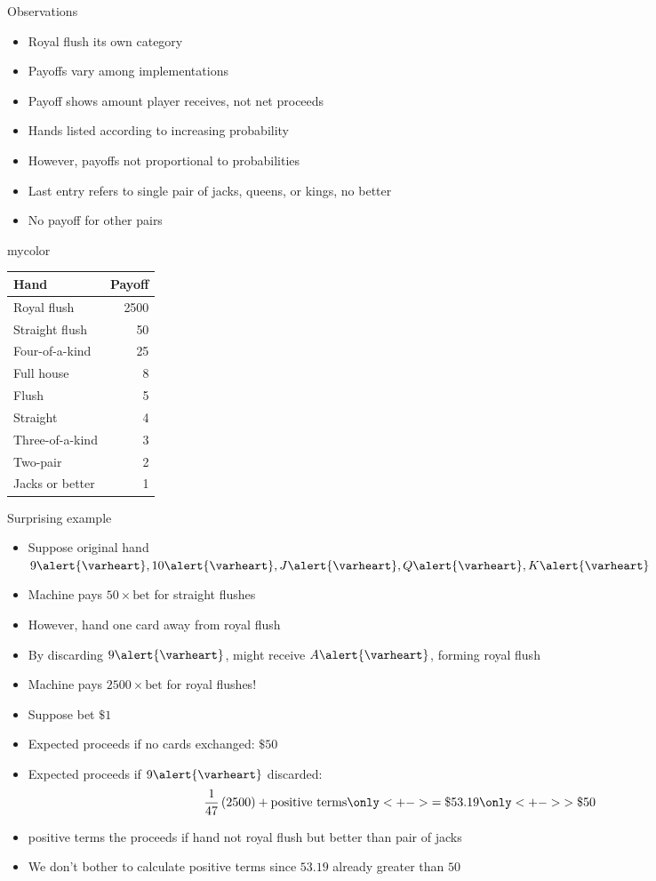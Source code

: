 \documentclass[handout,xcolor=dvipsnames]{beamer}
\theoremstyle{definition}
\newcommand{\hs}{\alert{\varheart}}
\begin{document}
\begin{frame}{Observations}
\begin{multicols}{2}
\begin{itemize}
\item Royal flush its own category
\item Payoffs vary among implementations
\item Payoff shows amount player receives, not net proceeds
\item Hands listed according to increasing probability
\item However, payoffs not proportional to probabilities
\item Last entry refers to
single pair of jacks, queens, or kings, no better
\item No payoff for other pairs
\end{itemize}
\begin{beamercolorbox}{mycolor}
\begin{tabular}{lr}
Hand&Payoff\\\hline
Royal flush&2500\\
Straight flush&50\\
Four-of-a-kind&25\\
Full house&8\\
Flush&5\\
Straight&4\\
Three-of-a-kind&3\\
Two-pair&2\\
Jacks or better&1
\end{tabular}
\end{beamercolorbox}
\end{multicols}
\end{frame}

\begin{frame}{Surprising example}
\begin{itemize}
\item Suppose original hand $9\hs,10\hs,J\hs,Q\hs,K\hs$
\item Machine pays $50\times\text{bet}$ for straight flushes
\item However, hand one card away from royal flush
\item By discarding $9\hs$, might receive $A\hs$, forming royal flush
\item Machine pays $2500\times\text{bet}$ for royal flushes!
\item Suppose bet $\$1$
\item Expected proceeds if no cards exchanged: $\$50$
\item Expected proceeds if $9\hs$ discarded:
\[\frac{1}{47}\left(2500\right)+\text{positive terms}
\only<+->{=\$53.19}
\only<+->{>\$50}\]
\item \alert{positive terms} the proceeds if
hand not royal flush but better than pair of jacks
\item We don't bother to calculate \alert{positive terms}
since $53.19$ already greater than $50$
\end{itemize}
\end{frame}
\end{document}

